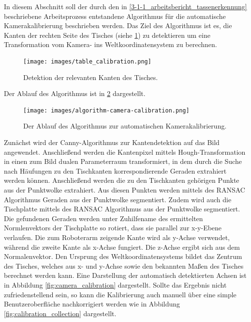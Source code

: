 In diesem Abschnitt soll der durch den in \ref{3-1-1_arbeitsbericht_tassenerkennung} beschriebene Arbeitsprozess entstandene Algorithmus für die automatische Kamerakalibrierung beschrieben werden. Das Ziel des Algorithmus ist es, die Kanten der rechten Seite des Tisches (siehe \ref{fig:kamerakalibrierung-tischkanten}) zu detektieren um eine Transformation vom Kamera- ins Weltkoordinatensystem zu berechnen.
\begin{figure}
	\centering
	\texttt{[image: images/table\_calibration.png]}
	\caption{Detektion der relevanten Kanten des Tisches. \label{fig:kamerakalibrierung-tischkanten}}
\end{figure}
Der Ablauf des Algorithmus ist in \ref{fig:algorithmus-kamerakalibrierung} dargestellt.
\begin{figure}
	\centering
	\texttt{[image: images/algorithm-camera-calibration.png]}
	\caption{Der Ablauf des Algorithmus zur automatischen Kamerakalibrierung. \label{fig:algorithmus-kamerakalibrierung}}
\end{figure}
Zunächst wird der Canny-Algorithmus zur Kantendetektion auf das Bild angewendet. Anschließend werden die Kantenpixel mittels Hough-Transformation in einen zum Bild dualen Parameterraum transformiert, in dem durch die Suche nach Häufungen zu den Tischkanten korrespondierende Geraden extrahiert werden können. Anschließend werden die zu den Tischkanten gehörigen Punkte aus der Punktwolke extrahiert. Aus diesen Punkten werden mittels des RANSAC Algorithmus Geraden aus der Punktwolke segmentiert. Zudem wird auch die Tischplatte mittels des RANSAC Algorithmus aus der Punktwolke segmentiert. Die gefundenen Geraden werden unter Zuhilfename des ermittelten Normlenvektors der Tischplatte so rotiert, dass sie parallel zur x-y-Ebene verlaufen. Die zum Roboterarm zeigende Kante wird als y-Achse verwendet, während die zweite Kante als x-Achse fungiert. Die z-Achse ergibt sich aus dem Normalenvektor. Den Ursprung des Weltkoordinatensystems bildet das Zentrum des Tisches, welches aus x- und y-Achse sowie den bekannten Maßen des Tisches berechnet werden kann. Eine Darstellung der automatisch detektierten Achsen ist in Abbildung \ref{fig:camera_calibration} dargestellt. Sollte das Ergebnis nicht zufriedenstellend sein, so kann die Kalibrierung auch manuell über eine simple Benutzeroberfläche nachkorrigiert werden wie in Abbildung \ref{fig:calibration_collection} dargestellt.
